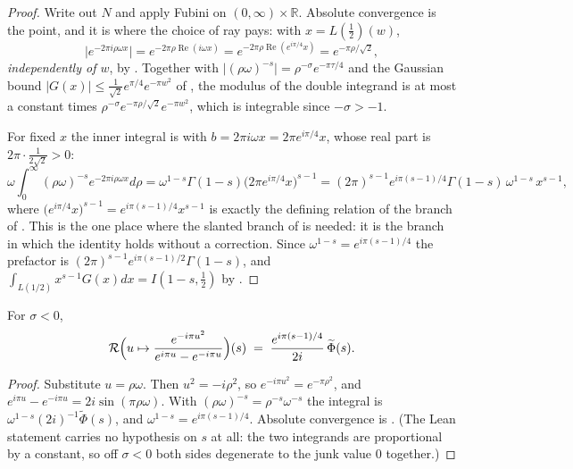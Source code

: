 \begin{proof}
\leanok
{}
Write out $N$ and apply Fubini on $(0,\infty)\times\mathbb{R}$.  Absolute convergence is the
point, and it is where the choice of ray pays: with $x=L(\tfrac12)(w)$,
\[
  \bigl\lvert e^{-2\pi i\rho\omega x}\bigr\rvert
   =e^{-2\pi\rho\operatorname{Re}(i\omega x)}=e^{-2\pi\rho\operatorname{Re}(e^{i\pi/4}x)}
   =e^{-\pi\rho/\sqrt2},
\]
\emph{independently of $w$}, by .  Together with
$\lvert(\rho\omega)^{-s}\rvert=\rho^{-\sigma}e^{-\pi\tau/4}$ and the Gaussian bound
$\lvert G(x)\rvert\le\tfrac1{\sqrt2}e^{\pi/4}e^{-\pi w^{2}}$ of ,
the modulus of the double integrand is at most a constant times
$\rho^{-\sigma}e^{-\pi\rho/\sqrt2}e^{-\pi w^{2}}$, which is integrable since $-\sigma>-1$.

For fixed $x$ the inner integral is  with
$b=2\pi i\omega x=2\pi e^{i\pi/4}x$, whose real part is $2\pi\cdot\tfrac1{2\sqrt2}>0$:
\[
  \omega\int_{0}^{\infty}(\rho\omega)^{-s}e^{-2\pi i\rho\omega x}d\rho
   =\omega^{1-s}\Gamma(1-s)\bigl(2\pi e^{i\pi/4}x\bigr)^{s-1}
   =(2\pi)^{s-1}e^{i\pi(s-1)/4}\Gamma(1-s)\,\omega^{1-s}\,x^{s-1},
\]
where $\bigl(e^{i\pi/4}x\bigr)^{s-1}=e^{i\pi(s-1)/4}x^{s-1}$ is exactly the defining relation
of the branch of .  This is the one place where the slanted branch
of  is needed: it is the branch in which the identity holds without a
correction.  Since
$\omega^{1-s}=e^{i\pi(s-1)/4}$ the prefactor is $(2\pi)^{s-1}e^{i\pi(s-1)/2}\Gamma(1-s)$, and
$\int_{L(1/2)}x^{s-1}G(x)dx=I(1-s,\tfrac12)$ by .
\end{proof}

\begin{lemma}
\label{lem:rsz_ray_hankel}
\leanok
{}
For $\sigma<0$,
\[
  \mathcal{R}\Bigl(u\mapsto\frac{e^{-i\pi u^{2}}}{e^{i\pi u}-e^{-i\pi u}}\Bigr)(s)
   \;=\;\frac{e^{i\pi(s-1)/4}}{2i}\,\widetilde\Phi(s).
\]
\end{lemma}

\begin{proof}
\leanok
{}
Substitute $u=\rho\omega$.  Then $u^{2}=-i\rho^{2}$, so $e^{-i\pi u^{2}}=e^{-\pi\rho^{2}}$,
and $e^{i\pi u}-e^{-i\pi u}=2i\sin(\pi\rho\omega)$.  With
$(\rho\omega)^{-s}=\rho^{-s}\omega^{-s}$ the integral is
$\omega^{1-s}(2i)^{-1}\widetilde\Phi(s)$, and $\omega^{1-s}=e^{i\pi(s-1)/4}$.  Absolute
convergence is .  (The Lean statement carries no hypothesis on $s$ at
all: the two integrands are proportional by a constant, so off $\sigma<0$ both sides degenerate to
the junk value $0$ together.)
\end{proof}

